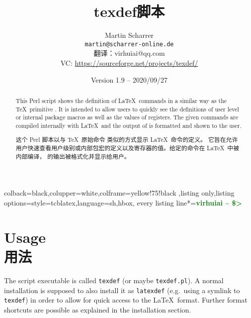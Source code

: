 \documentclass{article}
\title{\textsf{texdef}脚本}
\author{Martin Scharrer \\
\texttt{martin@scharrer-online.de}\\
翻译：virhuiai@qq.com\\
VC: \url{https://sourceforge.net/projects/texdef/}\\[-1.5em]
}
\date{Version 1.9 -- 2020/09/27}
\begin{document}
\renewcommand*{\tcbdocnew}[1]{\textcolor{green!50!black}{\sffamily\bfseries N} #1}
\renewcommand*{\tcbdocupdated}[1]{\textcolor{blue!75!black}{\sffamily\bfseries U} #1}

%
{colback=black,colupper=white,colframe=yellow!75!black%
,listing only,listing options={style=tcblatex,language=sh},hbox,
every listing line*={\textcolor{green}{\small\ttfamily\bfseries virhuiai \textasciitilde{} \$> }}}

\parindent=0pt
\maketitle


\begin{abstract}
\noindent
This Perl script shows the definition of \LaTeX\ commands in a similar way as the \TeX\ primitive \Macro\show.
It is intended to allow users to quickly see the definitions of user level or internal package macros as well as the
values of registers. The given commands are compiled internally with \LaTeX\ and the output of \Macro\show is formatted
and shown to the user.

\noindent
这个 Perl 脚本以与 \TeX\ 原始命令 \Macro\show 类似的方式显示 \LaTeX\ 命令的定义。
它旨在允许用户快速查看用户级别或内部包宏的定义以及寄存器的值。给定的命令在 \LaTeX\ 中被内部编译，
\Macro\show 的输出被格式化并显示给用户。
\end{abstract}

\section{\texorpdfstring{Usage\\用法}{用法}}

The script executable is called \texttt{texdef} (or maybe \texttt{texdef.pl}).
A normal installation is supposed to also install it as \texttt{latexdef} (e.g.\ using a symlink to \texttt{texdef}) in order to 
allow for quick access to the \LaTeX\ format. Further format shortcuts are possible as explained in the installation section.
\end{document}
